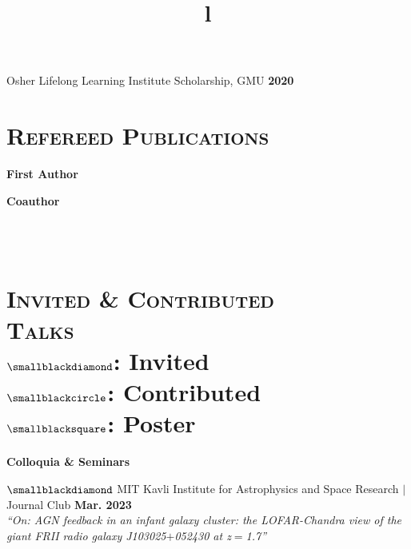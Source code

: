 \documentclass[marg, centered]{res}
\begin{document}
\begin{resume}
{Osher Lifelong Learning Institute Scholarship, GMU \hfill \textbf{2020}}
\vspace{-0.0cm}


\section{{\scshape \bfseries Refereed Publications}}

\vspace{-0.1cm}
\textbf{First Author}
\vspace{0.05cm}

\textbf{Coauthor}
\vspace{0.05cm}
\vspace{0.05cm}


\begin{format}
\title{l} \\
 \\
\body
\end{format}

\section{{\scshape \bfseries Invited \& Contributed \\Talks} \\
\vspace{0.1cm}
{\mdseries\small $\smallblackdiamond$: Invited\\
$\smallblackcircle$: Contributed\\
$\smallblacksquare$: Poster}
}

\textbf{Colloquia \& Seminars}

\begin{talks}[itemindent=0pt, leftmargin=19pt]

\item[{\small$\smallblackdiamond$}] MIT Kavli Institute for Astrophysics and Space Research $|$ Journal Club \hfill \textbf{Mar. 2023} \\
\textit{``On: AGN feedback in an infant galaxy cluster: the LOFAR-Chandra view of the giant FRII radio galaxy J103025$+$052430 at z$=$1.7''}


\end{talks}
\end{resume}
\end{document}
